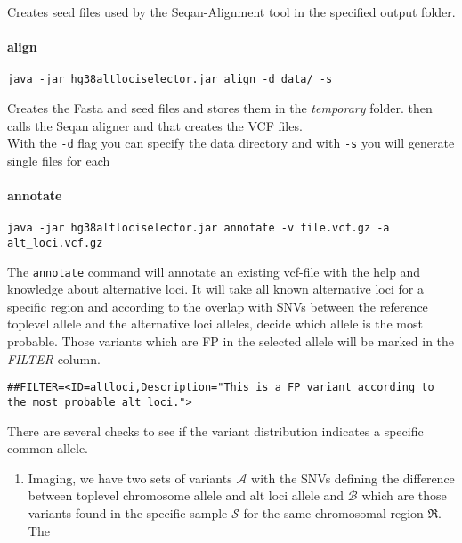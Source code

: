 \documentclass[10pt,a4paper]{article}
\begin{document}
Creates seed files used by the Seqan-Alignment tool in the specified output folder.

\paragraph*{align}
\begin{verbatim}
java -jar hg38altlociselector.jar align -d data/ -s
\end{verbatim}

Creates the Fasta and seed files and stores them in the \textit{temporary} folder. then calls the Seqan aligner and that creates the VCF files.\\
With the \texttt{-d} flag you can specify the data directory and with \texttt{-s} you will generate single files for each 

\paragraph*{annotate}
\begin{verbatim}
java -jar hg38altlociselector.jar annotate -v file.vcf.gz -a alt_loci.vcf.gz
\end{verbatim}

The \texttt{annotate} command will annotate an existing vcf-file with the help and knowledge about alternative loci. It will take all known alternative loci for a specific region and according to the overlap with SNVs between the reference toplevel allele and the alternative loci alleles, decide which allele is the most probable. Those variants which are FP in the selected allele will be marked in the \textit{FILTER} column.
\begin{verbatim}
##FILTER=<ID=altloci,Description="This is a FP variant according to the most probable alt loci.">
\end{verbatim}


There are several checks to see if the variant distribution indicates a specific common allele.
\begin{enumerate}
\item Imaging, we have two sets of variants $\mathcal{A}$ with the SNVs defining the difference between toplevel chromosome allele and alt loci allele and $\mathcal{B}$ which are those variants found in the specific sample $\mathcal{S}$ for the same chromosomal region $\Re$.\\
The 
\end{enumerate}
\end{document}
